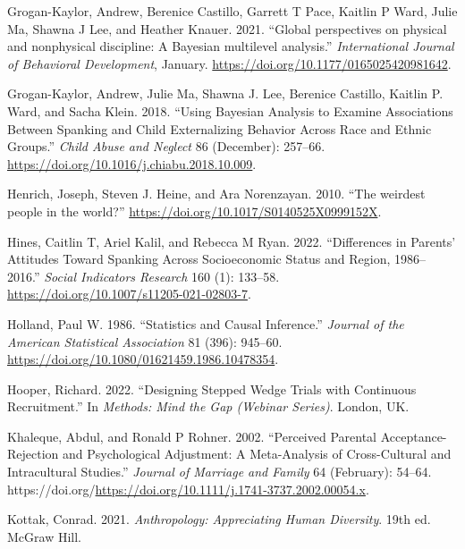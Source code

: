 \documentclass[
  letterpaper,
  DIV=11,
  numbers=noendperiod]{scrreprt}
\newlength{\cslhangindent}
\newlength{\cslentryspacingunit} %
\newenvironment{CSLReferences}[2] %
 {%
  \setlength{\parindent}{0pt}
  \ifodd #1
  \let\oldpar\par
  \def\par{\hangindent=\cslhangindent\oldpar}
  \fi
  \setlength{\parskip}{#2\cslentryspacingunit}
 }%
 {}
\begin{document}
\begin{CSLReferences}{1}{0}
\leavevmode{}%
Grogan-Kaylor, Andrew, Berenice Castillo, Garrett T Pace, Kaitlin P
Ward, Julie Ma, Shawna J Lee, and Heather Knauer. 2021. {``{Global
perspectives on physical and nonphysical discipline: A {B}ayesian
multilevel analysis}.''} \emph{International Journal of Behavioral
Development}, January. \url{https://doi.org/10.1177/0165025420981642}.

\leavevmode{}%
Grogan-Kaylor, Andrew, Julie Ma, Shawna J. Lee, Berenice Castillo,
Kaitlin P. Ward, and Sacha Klein. 2018. {``Using {B}ayesian Analysis to
Examine Associations Between Spanking and Child Externalizing Behavior
Across Race and Ethnic Groups.''} \emph{Child Abuse and Neglect} 86
(December): 257--66. \url{https://doi.org/10.1016/j.chiabu.2018.10.009}.

\leavevmode{}%
Henrich, Joseph, Steven J. Heine, and Ara Norenzayan. 2010. {``{The
weirdest people in the world?}''}
\url{https://doi.org/10.1017/S0140525X0999152X}.

\leavevmode{}%
Hines, Caitlin T, Ariel Kalil, and Rebecca M Ryan. 2022. {``{Differences
in Parents' Attitudes Toward Spanking Across Socioeconomic Status and
Region, 1986--2016}.''} \emph{Social Indicators Research} 160 (1):
133--58. \url{https://doi.org/10.1007/s11205-021-02803-7}.

\leavevmode{}%
Holland, Paul W. 1986. {``{Statistics and Causal Inference}.''}
\emph{Journal of the American Statistical Association} 81 (396):
945--60. \url{https://doi.org/10.1080/01621459.1986.10478354}.

\leavevmode{}%
Hooper, Richard. 2022. {``{Designing Stepped Wedge Trials with
Continuous Recruitment}.''} In \emph{Methods: Mind the Gap (Webinar
Series)}. London, UK.

\leavevmode{}%
Khaleque, Abdul, and Ronald P Rohner. 2002. {``Perceived Parental
Acceptance-Rejection and Psychological Adjustment: A Meta-Analysis of
Cross-Cultural and Intracultural Studies.''} \emph{Journal of Marriage
and Family} 64 (February): 54--64.
https://doi.org/\url{https://doi.org/10.1111/j.1741-3737.2002.00054.x}.

\leavevmode{}%
Kottak, Conrad. 2021. \emph{Anthropology: Appreciating Human Diversity}.
19th ed. McGraw Hill.


\end{CSLReferences}
\end{document}
